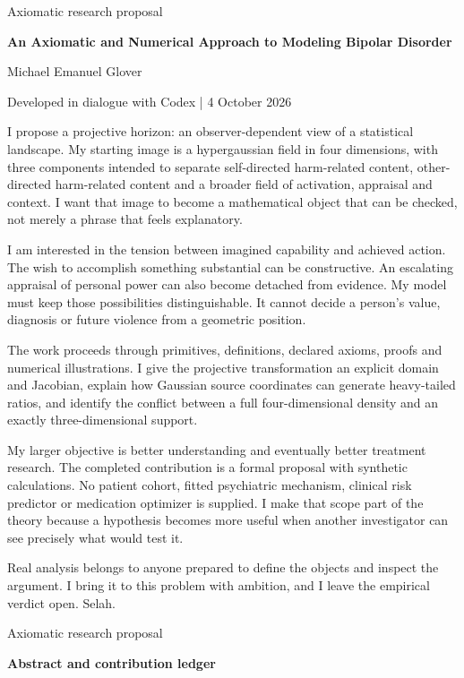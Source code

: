 \documentclass[10pt]{article}
\begin{document}
{\small\color{accent}Axiomatic research proposal}\par
{\LARGE\bfseries\color{ink}An Axiomatic and Numerical Approach to Modeling Bipolar Disorder}\par\vspace{7pt}
Michael Emanuel Glover\par Developed in dialogue with Codex | 4 October 2026\par\vspace{8pt}
I propose a projective horizon: an observer-dependent view of a statistical landscape. My starting image is a hypergaussian field in four dimensions, with three components intended to separate self-directed harm-related content, other-directed harm-related content and a broader field of activation, appraisal and context. I want that image to become a mathematical object that can be checked, not merely a phrase that feels explanatory.\par
I am interested in the tension between imagined capability and achieved action. The wish to accomplish something substantial can be constructive. An escalating appraisal of personal power can also become detached from evidence. My model must keep those possibilities distinguishable. It cannot decide a person's value, diagnosis or future violence from a geometric position.\par
The work proceeds through primitives, definitions, declared axioms, proofs and numerical illustrations. I give the projective transformation an explicit domain and Jacobian, explain how Gaussian source coordinates can generate heavy-tailed ratios, and identify the conflict between a full four-dimensional density and an exactly three-dimensional support.\par
My larger objective is better understanding and eventually better treatment research. The completed contribution is a formal proposal with synthetic calculations. No patient cohort, fitted psychiatric mechanism, clinical risk predictor or medication optimizer is supplied. I make that scope part of the theory because a hypothesis becomes more useful when another investigator can see precisely what would test it.\par
Real analysis belongs to anyone prepared to define the objects and inspect the argument. I bring it to this problem with ambition, and I leave the empirical verdict open. Selah.\par
\clearpage
{\small\color{accent}Axiomatic research proposal}\par
{\LARGE\bfseries\color{ink}Abstract and contribution ledger}\par\vspace{7pt}
\end{document}
